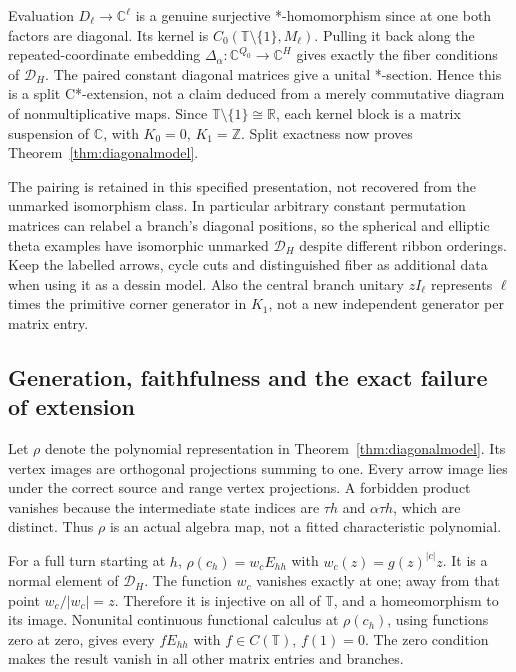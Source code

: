 \documentclass[11pt]{article}
\theoremstyle{definition}\newtheorem{definition}[theorem]{Definition}
\theoremstyle{remark}\newtheorem{remark}[theorem]{Remark}
\newcommand{\C}{\mathbb C}\newcommand{\Z}{\mathbb Z}\newcommand{\R}{\mathbb R}
\begin{document}
Evaluation $D_\ell\to\C^\ell$ is a genuine surjective *-homomorphism since at one both factors are diagonal. Its kernel is $C_0(\mathbb T\setminus\{1\},M_\ell)$. Pulling it back along the repeated-coordinate embedding $\Delta_\alpha:\C^{Q_0}\to\C^H$ gives exactly the fiber conditions of $\mathcal D_H$. The paired constant diagonal matrices give a unital *-section. Hence this is a split C*-extension, not a claim deduced from a merely commutative diagram of nonmultiplicative maps. Since $\mathbb T\setminus\{1\}\cong\R$, each kernel block is a matrix suspension of $\C$, with $K_0=0$, $K_1=\Z$. Split exactness now proves Theorem~\ref{thm:diagonalmodel}.

The pairing is retained in this specified presentation, not recovered from the unmarked isomorphism class. In particular arbitrary constant permutation matrices can relabel a branch's diagonal positions, so the spherical and elliptic theta examples have isomorphic unmarked $\mathcal D_H$ despite different ribbon orderings. Keep the labelled arrows, cycle cuts and distinguished fiber as additional data when using it as a dessin model. Also the central branch unitary $zI_\ell$ represents $\ell$ times the primitive corner generator in $K_1$, not a new independent generator per matrix entry.

\subsection{Generation, faithfulness and the exact failure of extension}
Let $\rho$ denote the polynomial representation in Theorem~\ref{thm:diagonalmodel}. Its vertex images are orthogonal projections summing to one. Every arrow image lies under the correct source and range vertex projections. A forbidden product vanishes because the intermediate state indices are $\tau h$ and $\alpha\tau h$, which are distinct. Thus $\rho$ is an actual algebra map, not a fitted characteristic polynomial.

For a full turn starting at $h$, $\rho(c_h)=w_cE_{hh}$ with $w_c(z)=g(z)^{|c|}z$. It is a normal element of $\mathcal D_H$. The function $w_c$ vanishes exactly at one; away from that point $w_c/|w_c|=z$. Therefore it is injective on all of $\mathbb T$, and a homeomorphism to its image. Nonunital continuous functional calculus at $\rho(c_h)$, using functions zero at zero, gives every $fE_{hh}$ with $f\in C(\mathbb T)$, $f(1)=0$. The zero condition makes the result vanish in all other matrix entries and branches.
\end{document}
